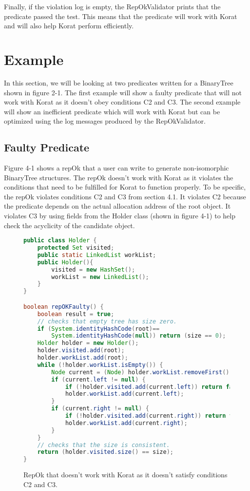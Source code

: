 \par
Finally, if the violation log is empty, the RepOkValidator prints that the predicate passed the test. This means that the predicate will work with Korat and will also help Korat perform efficiently.

\section{Example}
In this section, we will be looking at two predicates written for a BinaryTree shown in figure 2-1. The first example will show a faulty predicate that will not work with Korat as it doesn’t obey conditions C2 and C3. The second example will show an inefficient predicate which will work with Korat but can be optimized using the log messages produced by the RepOkValidator.

\subsection{Faulty Predicate}
Figure 4-1 shows a repOk that a user can write to generate non-isomorphic BinaryTree structures. The repOk doesn’t work with Korat as it violates the conditions that need to be fulfilled for Korat to function properly. To be specific, the repOk violates conditions C2 and C3 from section 4.1. It violates C2 because the predicate depends on the actual allocation address of the root object. It violates C3 by using fields from the Holder class (shown in figure 4-1) to help check the acyclicity of the candidate object.

\begin{figure}
\centering
\begin{lstlisting}[language=Java]
public class Holder {
    protected Set visited;
    public static LinkedList workList;
    public Holder(){
        visited = new HashSet();
        workList = new LinkedList();
    }
}

boolean repOKFaulty() {
    boolean result = true;
    // checks that empty tree has size zero.
    if (System.identityHashCode(root)== 
        System.identityHashCode(null)) return (size == 0);
    Holder holder = new Holder();
    holder.visited.add(root);
    holder.workList.add(root);
    while (!holder.workList.isEmpty()) {
        Node current = (Node) holder.workList.removeFirst();
        if (current.left != null) {
            if (!holder.visited.add(current.left)) return false;
            holder.workList.add(current.left);
        }
        if (current.right != null) {
            if (!holder.visited.add(current.right)) return false;
            holder.workList.add(current.right);
        }
    }
    // checks that the size is consistent.
    return (holder.visited.size() == size);
}
\end{lstlisting}
\caption{RepOk that doesn’t work with Korat as it doesn’t satisfy conditions C2 and C3.}
\label{fig:repOkKoratSatisfyCorrectness}
\end{figure}

